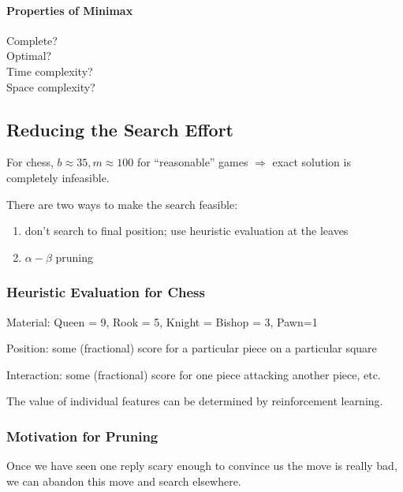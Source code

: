 \paragraph{Properties of Minimax}
Complete?\\
Optimal?\\
Time complexity?\\
Space complexity?

\subsection{Reducing the Search Effort}
For chess, $b \approx 35, m \approx 100$ for ``reasonable'' games $\Rightarrow$
exact solution is completely infeasible.

There are two ways to make the search feasible:
\begin{enumerate}
    \item don't search to final position; use heuristic evaluation at the
    leaves
    \item $\alpha-\beta$ pruning
\end{enumerate}

\subsubsection{Heuristic Evaluation for Chess}
Material: Queen = 9, Rook = 5, Knight = Bishop = 3, Pawn=1

Position: some (fractional) score for a particular piece on a particular square

Interaction: some (fractional) score for one piece attacking another piece,
etc.

The value of individual features can be determined by reinforcement learning.

\subsubsection{Motivation for Pruning}
Once we have seen one reply scary enough to convince us the move is really bad,
we can abandon this move and search elsewhere.

